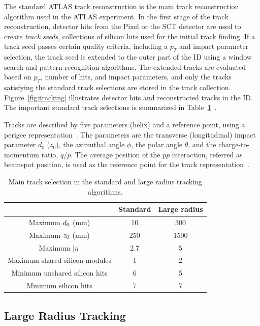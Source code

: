 The standard ATLAS track reconstruction is the main track reconstruction algorithm used in the ATLAS experiment. In the first stage of the track reconstruction, detector hits from the Pixel or the SCT detector are used to create \textit{track seeds}, collections of silicon hits used for the initial track finding. If a track seed passes certain quality criteria, including a $p_{T}$ and impact parameter selection, the track seed is extended to the outer part of the ID using a window search and pattern recognition algorithms. The extended tracks are evaluated based on $p_{T}$, number of hits, and impact parameters, and only the tracks satisfying the standard track selections are stored in the track collection. Figure~\ref{fig:tracking} illustrates detector hits and reconstructed tracks in the ID. The important standard track selections is summarized in Table~\ref{table:tracking}~\cite{ATL-PHYS-PUB-2017-014}.


Tracks are described by five parameters (helix) and a reference point, using a perigee representation~\cite{Akesson:973401}. The parameters are the transverse (longitudinal) impact parameter $d_{0}$ ($z_{0}$), the azimuthal angle $\phi$, the polar angle $\theta$, and the charge-to-momentum ratio, $q/p$. The average position of the $pp$ interaction, referred as beamspot position, is used as the reference point for the track representation~\cite{Aaboud:2016rmg}.


\begin{table}[!htb]
  \centering
  \begin{tabular}{ c  c  c }
    \hline
    \hline
    & Standard & Large radius \\ [0.5ex]
    \hline
    Maximum $d_{\rm{0}}$ (mm) & 10 & 300 \\
    Maximum $z_{\rm{0}}$ (mm) & 250 & 1500 \\
    Maximum $|\eta|$ & 2.7 & 5 \\
    Maximum shared silicon modules & 1 & 2 \\
    Minimum unshared silicon hits& 6 & 5 \\
    Minimum silicon hits & 7 & 7\\
    \hline
    \hline
  \end{tabular}
  \caption{Main track selection in the standard and large radius tracking algorithms.}
  \label{table:tracking}
\end{table}


\subsection{Large Radius Tracking}
\label{sec:reco:lrt}

